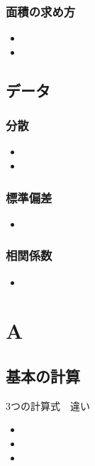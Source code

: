 \documentclass[10pt,dvipdfmx]{jsarticle}
\begin{document}
\subsubsection*{面積の求め方}
\begin{LARGE}
  \begin{itemize}
    \item  \item
  \end{itemize}
\end{LARGE}

\newpage
\subsection*{データ}
\subsubsection*{分散}
\begin{LARGE}
  \begin{itemize}
    \item \item
  \end{itemize}
\end{LARGE}

\subsubsection*{標準偏差}
\begin{LARGE}
  \begin{itemize}
    \item
  \end{itemize}
\end{LARGE}

\subsubsection*{相関係数}
\begin{LARGE}
  \begin{itemize}
    \item
  \end{itemize}
\end{LARGE}

\newpage
\section*{A}
\subsection*{基本の計算}
\begin{itembox}[l]{3つの計算式　違い}
  \begin{multicols}{3}
    \begin{itemize}
      \item \item \item
    \end{itemize}
  \end{multicols}
\end{itembox}
\end{document}
